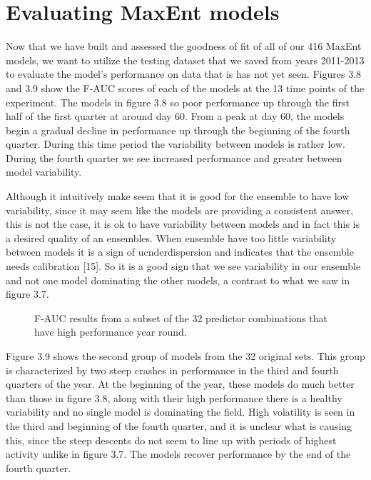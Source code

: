 \section{Evaluating MaxEnt models}

Now that we have built and assessed the goodness of fit of all of our 416 MaxEnt models, we want to utilize the testing dataset that we saved from years 2011-2013 to evaluate the model's performance on data that is has not yet seen. Figures 3.8 and 3.9 show the F-AUC scores of each of the models at the 13 time points of the experiment. The models in figure 3.8 so poor performance up through the first half of the first quarter at around day 60. From a peak at day 60, the models begin a gradual decline in performance up through the beginning of the fourth quarter. During this time period the variability between models is rather low. During the fourth quarter we see increased performance and greater between model variability. \newline

\noindent Although it intuitively make seem that it is good for the ensemble to have low variability, since it may seem like the models are providing a consistent answer, this is not the case, it is ok to have variability between models and in fact this is a desired quality of an ensembles. When ensemble have too little variability between models it is a sign of ucnderdispersion and indicates that the ensemble needs calibration [15]. So it is a good sign that we see variability in our ensemble and not one model dominating the other models, a contrast to what we saw in figure 3.7. \newline


\begin{figure} [!ht]
\centerline{}
\caption{F-AUC results from a subset of the 32 predictor combinations that have high performance year round. }
\label{fig6}
\end{figure}

\noindent Figure 3.9 shows the second group of models from the 32 original sets. This group is characterized by two steep crashes in performance in the third and fourth quarters of the year. At the beginning of the year, these models do much better than those in figure 3.8, along with their high performance there is a healthy variability and no single model is dominating the field. High volatility is seen in the third and beginning of the fourth quarter, and it is unclear what is causing this, since the steep descents do not seem to line up with periods of highest activity unlike in figure 3.7.  The models recover performance by the end of the fourth quarter. \newline



